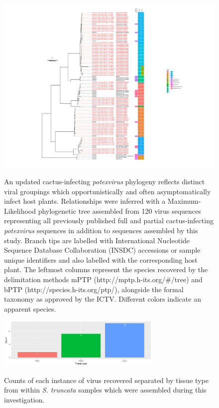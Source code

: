 \documentclass[fleqn,10pt,lineno]{wlpeerj}
\begin{document}

\begin{figure}[ht]
\centering
\caption{
An updated cactus-infecting \textit{potexvirus} phylogeny reflects distinct viral groupings which opportunistically and often asymptomatically infect host plants. Relationships were inferred with a Maximum-Likelihood phylogenetic tree assembled from 120 virus sequences representing all previously published full and partial cactus-infecting \textit{potexvirus} sequences in addition to sequences assembled by this study. Branch tips are labelled with International Nucleotide Sequence Database Collaboration (INSDC) accessions or sample unique identifiers and also labelled with the corresponding host plant.
The leftmost columns represent the species recovered by the delimitation methods mPTP (http://mptp.h-its.org/\#/tree) and bPTP (http://species.h-its.org/ptp/), alongside the formal taxonomy as approved by the ICTV.  
Different colors indicate an apparent species.
}
\includegraphics[width=1.0\textwidth]{figures/tree_rect_delim_info.pdf}
\label{fig:tissuetype}
\end{figure}
\clearpage


\begin{figure}[ht]
\centering
\caption{
Counts of each instance of virus recovered separated by tissue type from within \textit{S. truncata} samples which were assembled during this investigation.
}
\includegraphics[width=0.7\textwidth]{figures/tistype}
\label{fig:tissuetype}
\end{figure}
\end{document}
